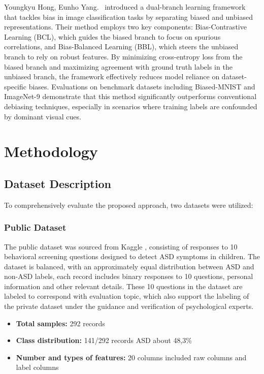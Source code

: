 \documentclass[conference]{IEEEtran}
\begin{document}
Youngkyu Hong, Eunho Yang.~\cite{b5} introduced a dual-branch learning framework that tackles bias in image classification tasks by separating biased and unbiased representations. Their method employs two key components: Bias-Contrastive Learning (BCL), which guides the biased branch to focus on spurious correlations, and Bias-Balanced Learning (BBL), which steers the unbiased branch to rely on robust features. By minimizing cross-entropy loss from the biased branch and maximizing agreement with ground truth labels in the unbiased branch, the framework effectively reduces model reliance on dataset-specific biases. Evaluations on benchmark datasets including Biased-MNIST and ImageNet-9 demonstrate that this method significantly outperforms conventional debiasing techniques, especially in scenarios where training labels are confounded by dominant visual cues.


\section{Methodology}
\subsection{Dataset Description}
To comprehensively evaluate the proposed approach, two datasets were utilized:

\subsubsection{Public Dataset}
The public dataset was sourced from Kaggle \cite{b18}, consisting of responses to 10 behavioral screening questions designed to detect ASD symptoms in children. The dataset is balanced, with an approximately equal distribution between ASD and non-ASD labels, each record includes binary responses to 10 questions, personal information and other relevant details. These 10 questions in the dataset are labeled to correspond with evaluation topic, which also support the labeling of the private dataset under the guidance and verification of psychological experts.
\begin{itemize}
    \item \textbf{Total samples:} 292 records
    \item \textbf{Class distribution:} 141/292 records ASD about 48,3\% 
    \item \textbf{Number and types of features:} 20 columns included raw columns and label columns
\end{itemize}
\end{document}
